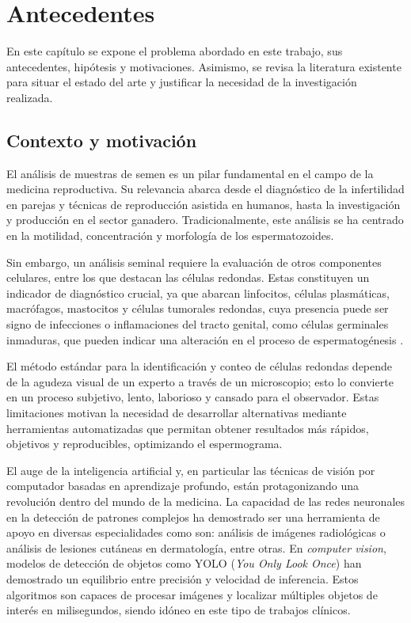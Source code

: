 \documentclass[12pt,a4paper,onecolumn,oneside]{report}
\begin{document}
\chapter{Antecedentes} %
\label{Antecedentes}

En este capítulo se expone el problema abordado en este trabajo, sus antecedentes, hipótesis y motivaciones. 
Asimismo, se revisa la literatura existente para situar el estado del arte y justificar la necesidad de la investigación realizada.

\section{Contexto y motivación}
\label{sec:Contexto y motivación}

El análisis de muestras de semen es un pilar fundamental en el campo de la medicina reproductiva. Su relevancia abarca desde el diagnóstico 
de la infertilidad en parejas y técnicas de reproducción asistida en humanos, hasta la investigación y producción en el sector ganadero. Tradicionalmente,
este análisis se ha centrado en la motilidad, concentración y morfología de los espermatozoides.

Sin embargo, un análisis seminal requiere la evaluación de otros componentes celulares, entre los que destacan las células redondas. 
Estas constituyen un indicador de diagnóstico crucial, ya que abarcan linfocitos, células plasmáticas, macrófagos, mastocitos y células tumorales redondas, cuya presencia puede ser signo de infecciones o inflamaciones 
del tracto genital, como células germinales inmaduras, que pueden indicar una alteración en el proceso de espermatogénesis \cite{HamiltonThorneRoundCells}.

El método estándar para la identificación y conteo de células redondas depende de la agudeza visual de un experto a través de un microscopio; esto lo convierte en
un proceso subjetivo, lento, laborioso y cansado para el observador. Estas limitaciones motivan la necesidad 
de desarrollar alternativas mediante herramientas automatizadas que permitan obtener resultados más rápidos, objetivos y reproducibles, optimizando el espermograma.

El auge de la inteligencia artificial y, en particular las técnicas de visión por computador basadas en aprendizaje profundo, están protagonizando una revolución dentro del mundo de la medicina.
La capacidad de las redes neuronales en la detección de patrones complejos ha demostrado ser una herramienta de apoyo en diversas especialidades como son: análisis de imágenes radiológicas o análisis de lesiones cutáneas en dermatología, entre otras.
En \textit{computer vision}, modelos de detección de objetos como YOLO (\textit{You Only Look Once}) \cite{ultralytics_models} han demostrado un equilibrio entre precisión y velocidad de inferencia. Estos algoritmos son capaces 
de procesar imágenes y localizar múltiples objetos de interés en milisegundos, siendo idóneo en este tipo de trabajos clínicos.
\end{document}
